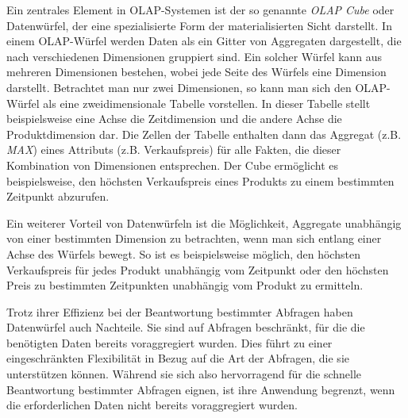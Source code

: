 Ein zentrales Element in OLAP-Systemen ist der so genannte \emph{OLAP Cube} oder Datenwürfel, der eine spezialisierte Form der materialisierten Sicht darstellt. In einem OLAP-Würfel werden Daten als ein Gitter von Aggregaten dargestellt, die nach verschiedenen Dimensionen gruppiert sind. Ein solcher Würfel kann aus mehreren Dimensionen bestehen, wobei jede Seite des Würfels eine Dimension darstellt. Betrachtet man nur zwei Dimensionen, so kann man sich den OLAP-Würfel als eine zweidimensionale Tabelle vorstellen. In dieser Tabelle stellt beispielsweise eine Achse die Zeitdimension und die andere Achse die Produktdimension dar. Die Zellen der Tabelle enthalten dann das Aggregat (z.B. \emph{MAX}) eines Attributs (z.B. Verkaufspreis) für alle Fakten, die dieser Kombination von Dimensionen entsprechen. Der Cube ermöglicht es beispielsweise, den höchsten Verkaufspreis eines Produkts zu einem bestimmten Zeitpunkt abzurufen.

Ein weiterer Vorteil von Datenwürfeln ist die Möglichkeit, Aggregate unabhängig von einer bestimmten Dimension zu betrachten, wenn man sich entlang einer Achse des Würfels bewegt. So ist es beispielsweise möglich, den höchsten Verkaufspreis für jedes Produkt unabhängig vom Zeitpunkt oder den höchsten Preis zu bestimmten Zeitpunkten unabhängig vom Produkt zu ermitteln.

Trotz ihrer Effizienz bei der Beantwortung bestimmter Abfragen haben Datenwürfel auch Nachteile. Sie sind auf Abfragen beschränkt, für die die benötigten Daten bereits voraggregiert wurden. Dies führt zu einer eingeschränkten Flexibilität in Bezug auf die Art der Abfragen, die sie unterstützen können. Während sie sich also hervorragend für die schnelle Beantwortung bestimmter Abfragen eignen, ist ihre Anwendung begrenzt, wenn die erforderlichen Daten nicht bereits voraggregiert wurden.

